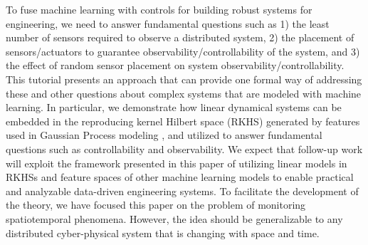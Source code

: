 To fuse machine learning with controls for building robust systems for engineering, we need to answer fundamental questions such as 1) the least number of sensors required to observe a distributed system, 2) the placement of sensors/actuators to guarantee observability/controllability of the system, and 3) the effect of random sensor placement on system observability/controllability.
This tutorial presents an approach that can provide one formal way of addressing these and other questions about complex systems that are modeled with machine learning. In particular, we demonstrate how linear dynamical systems can be embedded in the reproducing kernel Hilbert space (RKHS) \cite{schoelkopf01kernelbased,ams:cucker,kingravi2012reproducing} generated by features used in Gaussian Process modeling \cite{Liu2018csmtutorial,rasmussen2006gaussian}, %
and utilized to answer fundamental questions such as controllability and observability. 
We expect that follow-up work will exploit the framework presented in this paper of utilizing linear models in RKHSs and feature spaces of other machine learning models to enable practical and analyzable data-driven engineering systems. To facilitate the development of the theory, we have focused this paper on the problem of monitoring spatiotemporal phenomena. However, the idea should be generalizable to any distributed cyber-physical system that is changing with space and time. %
